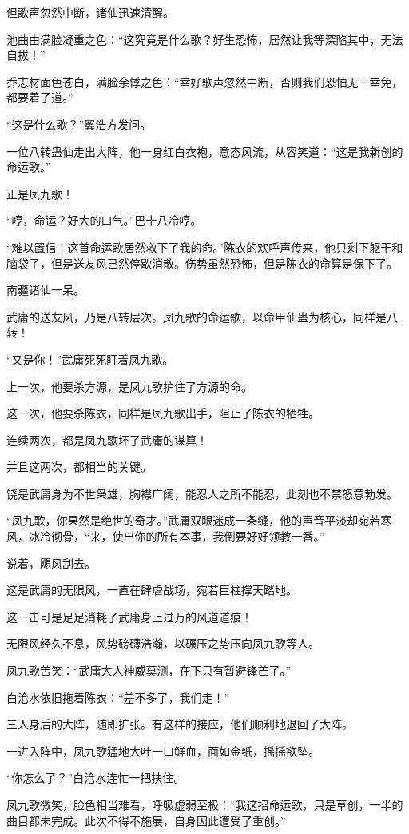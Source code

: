 \begin{this_body}
但歌声忽然中断，诸仙迅速清醒。

池曲由满脸凝重之色：“这究竟是什么歌？好生恐怖，居然让我等深陷其中，无法自拔！”

乔志材面色苍白，满脸余悸之色：“幸好歌声忽然中断，否则我们恐怕无一幸免，都要着了道。”

“这是什么歌？”翼浩方发问。

一位八转蛊仙走出大阵，他一身红白衣袍，意态风流，从容笑道：“这是我新创的命运歌。”

正是凤九歌！

“哼，命运？好大的口气。”巴十八冷哼。

“难以置信！这首命运歌居然救下了我的命。”陈衣的欢呼声传来，他只剩下躯干和脑袋了，但是送友风已然停歇消散。伤势虽然恐怖，但是陈衣的命算是保下了。

南疆诸仙一呆。

武庸的送友风，乃是八转层次。凤九歌的命运歌，以命甲仙蛊为核心，同样是八转！

“又是你！”武庸死死盯着凤九歌。

上一次，他要杀方源，是凤九歌护住了方源的命。

这一次，他要杀陈衣，同样是凤九歌出手，阻止了陈衣的牺牲。

连续两次，都是凤九歌坏了武庸的谋算！

并且这两次，都相当的关键。

饶是武庸身为不世枭雄，胸襟广阔，能忍人之所不能忍，此刻也不禁怒意勃发。

“凤九歌，你果然是绝世的奇才。”武庸双眼迷成一条缝，他的声音平淡却宛若寒风，冰冷彻骨，“来，使出你的所有本事，我倒要好好领教一番。”

说着，飓风刮去。

这是武庸的无限风，一直在肆虐战场，宛若巨柱撑天踏地。

这一击可是足足消耗了武庸身上过万的风道道痕！

无限风经久不息，风势磅礴浩瀚，以碾压之势压向凤九歌等人。

凤九歌苦笑：“武庸大人神威莫测，在下只有暂避锋芒了。”

白沧水依旧拖着陈衣：“差不多了，我们走！”

三人身后的大阵，随即扩张。有这样的接应，他们顺利地退回了大阵。

一进入阵中，凤九歌猛地大吐一口鲜血，面如金纸，摇摇欲坠。

“你怎么了？”白沧水连忙一把扶住。

凤九歌微笑，脸色相当难看，呼吸虚弱至极：“我这招命运歌，只是草创，一半的曲目都未完成。此次不得不施展，自身因此遭受了重创。”


\end{this_body}
